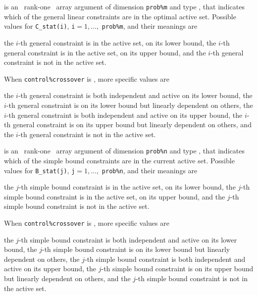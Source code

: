 \documentclass{galahad}
\begin{document}
\begin{description}
 is an \optional\ rank-one \intentout\ array argument of
dimension {\tt prob\%m}
and type \integer, that indicates which of the general linear
constraints are in the optimal active set. Possible values for
{\tt C\_stat(i)}, {\tt i}$=1, \ldots ,$ {\tt prob\%m}, and their meanings are
\begin{description}
 the $i$-th general constraint
is in the active set, on its lower bound,
 the $i$-th general constraint
is in the active set, on its upper bound, and
  the $i$-th general constraint is not in the active set.
\end{description}
When {\tt control\%crossover} is \true, more specific values are
\begin{description}
 the $i$-th general constraint
is both independent and active on its lower bound,
 the $i$-th general constraint
is on its lower bound but linearly dependent on others,
 the $i$-th general constraint
is both independent and active on its upper bound,
 the $i$-th general constraint
is on its upper bound but linearly dependent on others, and
 the $i$-th general constraint is not in the active set.
\end{description}

 is an \optional\ rank-one \intentout\ array argument of
dimension {\tt prob\%n}
and type \integer, that indicates which of the simple bound
constraints are in the current active set. Possible values for
{\tt B\_stat(j)}, {\tt j}$=1, \ldots ,$ {\tt prob\%n}, and their meanings are
\begin{description}
 the $j$-th simple bound constraint
is in the active set, on its lower bound,
 the $j$-th simple bound constraint
is in the active set, on its upper bound, and
  the $j$-th simple bound constraint is not in the active set.
\end{description}
When {\tt control\%crossover} is \true, more specific values are
\begin{description}
 the $j$-th simple bound constraint
is both independent and active on its lower bound,
 the $j$-th simple bound constraint
is on its lower bound but linearly dependent on others,
 the $j$-th simple bound constraint
is both independent and active on its upper bound,
 the $j$-th simple bound constraint
is on its upper bound but linearly dependent on others, and
 the $j$-th simple bound constraint is not in the active set.
\end{description}

\end{description}
\end{document}
